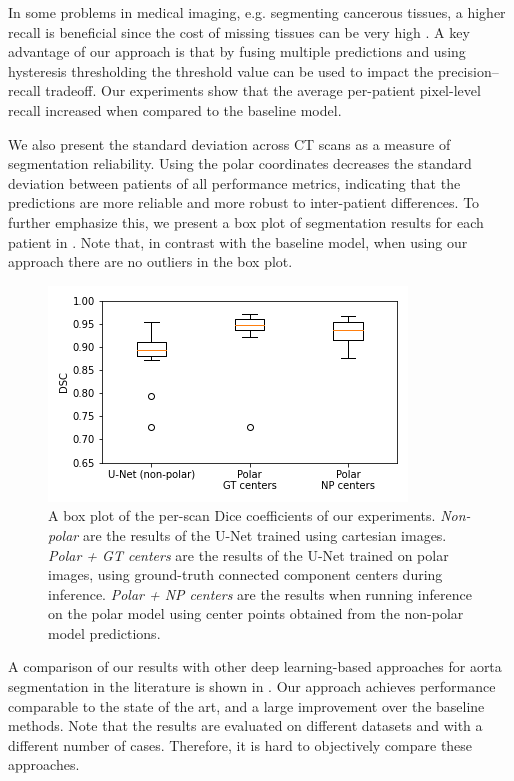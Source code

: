 In some problems in medical imaging, e.g. segmenting cancerous tissues, a higher recall is beneficial since the cost of missing tissues can be very high \cite{tahaMetricsEvaluating3D2015}. A key advantage of our approach is that by fusing multiple predictions and using hysteresis thresholding the threshold value can be used to impact the precision--recall tradeoff. Our experiments show that the average per-patient pixel-level recall increased when compared to the baseline model.

We also present the standard deviation across CT scans as a measure of segmentation reliability. Using the polar coordinates decreases the standard deviation between patients of all performance metrics, indicating that the predictions are more reliable and more robust to inter-patient differences. To further emphasize this, we present a box plot of segmentation results for each patient in . Note that, in contrast with the baseline model, when using our approach there are no outliers in the box plot.

\begin{figure}[h]
\centering
\includegraphics[width=0.7\columnwidth]{images/4/box_plot}
\caption{A box plot of the per-scan Dice coefficients of our experiments. \textit{Non-polar} are the results of the U-Net trained using cartesian images. \textit{Polar + GT centers} are the results of the U-Net trained on polar images, using ground-truth connected component centers during inference. \textit{Polar + NP centers} are the results when running inference on the polar model using center points obtained from the non-polar model predictions. \cite{bencevicUsingPolarTransform2022a}}
\label{fig:box}
\end{figure}

A comparison of our results with other deep learning-based approaches for aorta segmentation in the literature is shown in . Our approach achieves performance comparable to the state of the art, and a large improvement over the baseline methods. Note that the results are evaluated on different datasets and with a different number of cases. Therefore, it is hard to objectively compare these approaches.

